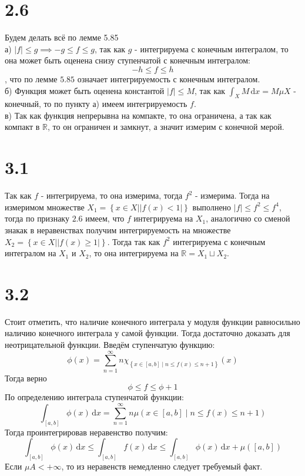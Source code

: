 \documentclass[12pt]{article}
\begin{document}
\section{2.6}
Будем делать всё по лемме 5.85 
\\а) $\vert f \vert \leq g \implies -g \leq f \leq g$, так как $g$ - интегрируема с конечным интегралом, то 
она может быть оценена снизу ступенчатой с конечным интегралом: 
\[
    -h \leq f \leq h
\], 
что по лемме $5.85$ означает интегрируемость с конечным интегралом.
\\б) Функция может быть оценена константой $\vert f \vert \leq M$, так как $\int_{X} M \,\mathrm{d}x = M \mu X$ - 
конечный, то по пункту а) имеем интегрируемость $f$. 
\\в) Так как функция непрерывна на компакте, то она ограничена, а так как компакт в $\mathbb{R}$, 
то он ограничен и замкнут, а значит измерим с конечной мерой. 
\section{3.1}
Так как $f$ - интегрируема, то она измерима, тогда $f^2$ - измерима. 
Тогда на измеримом множестве $X_1 = \left\{ x \in X \mid \vert f(x) < 1 \vert  \right\}$ 
выполнено $\vert f \vert \leq f^2 \leq f^4$, тогда по признаку $2.6$ имеем, что $f$ интегрируема на 
$X_1$, аналогично со сменой знакак в неравенствах получим интегрируемость на множестве 
$X_2 = \left\{ x \in X \mid \vert f(x) \geq 1 \vert \right\}$. Тогда так как $f^2$ 
интегрируема с конечным интегралом на $X_1$ и $X_2$, то она интегрируема на 
$\mathbb{R} = X_1 \sqcup X_2$. 
\section{3.2}
Стоит отметить, что наличие конечного интеграла у модуля функции равносильно наличию конечного интеграла у 
самой функции. Тогда достаточно доказать для неотрицательной функции. 
Введём ступенчатую функцию: 
\[
    \phi(x) = \sum_{n=1}^{\infty} n \chi_{\left\{ x \in [a, b] \mid n \leq f(x) \leq n + 1 \right\}} (x)
\]
Тогда верно 
\[
    \phi \leq f \leq \phi + 1
\]      
По определению интеграла ступенчатой функции: 
\[
    \int_{[a, b]} \phi(x) \,\mathrm{d}x = \sum_{n=1}^{\infty} n \mu(x \in [a, b] \mid n \leq f(x) \leq n + 1 )
\]
Тогда проинтегрировав неравенство получим: 
\[
    \int_{[a, b]} \phi(x) \,\mathrm{d}x \leq \int_{[a, b]} f(x) \,\mathrm{d}x \leq \int_{[a, b]} \phi(x) \,\mathrm{d}x + \mu([a, b]) 
\]
Если $\mu A < +\infty$, то из неравенств немедленно следует требуемый факт. 
\end{document}
